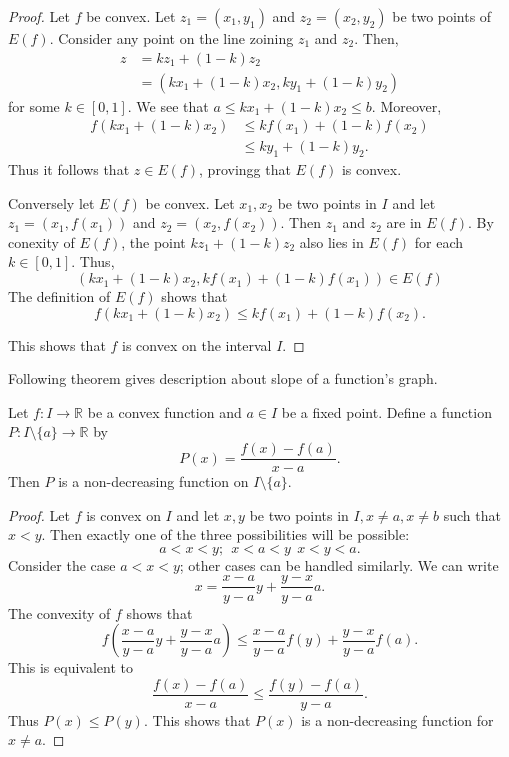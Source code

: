 \begin{proof}
  Let $f$ be convex. Let $z_1 = (x_1, y_1)$ and $z_2 = (x_2, y_2)$ be two points of $E(f)$. Consider any point on the line zoining
  $z_1$ and $z_2$. Then,
  $$\begin{aligned}z & = kz_1 + (1 - k)z_2\\& = (kx_1 + (1 - k)x_2, ky_1 + (1 - k)y_2)\end{aligned}$$ for some $k\in[0, 1]$. We see
  that $a\leq kx_1 + (1 - k)x_2\leq b$. Moreover,
  $$\begin{aligned}f(kx_1 + (1 - k)x_2)&\leq kf(x_1) + (1 - k)f(x_2)\\&\leq ky_1 + (1 - k)y_2.\end{aligned}$$
  Thus it follows that $z\in E(f)$, provingg that $E(f)$ is convex.

  Conversely let $E(f)$ be convex. Let $x_1, x_2$ be two points in $I$ and let $z_1 = (x_1,f(x_1))$ and $z_2 = (x_2, f(x_2))$. Then
  $z_1$ and $z_2$ are in $E(f)$. By conexity of $E(f)$, the point $kz_1 + (1 - k)z_2$ also lies in $E(f)$ for each $k\in[0,
    1]$. Thus,
  $$(kx_1 + (1 - k)x_2, kf(x_1) + (1 - k)f(x_1))\in E(f)$$
  The definition of $E(f)$ shows that $$f(kx_1 + (1 - k)x_2)\leq kf(x_1) + (1 - k)f(x_2).$$

  This shows that $f$ is convex on the interval $I$.
\end{proof}

Following theorem gives description about slope of a function's graph.

\begin{theorem}
  Let $f:I\rightarrow\mathbb{R}$ be a convex function and $a\in I$ be a fixed point. Define a function $P:I\setminus\{a\}\rightarrow
  \mathbb{R}$ by $$P(x) = \frac{f(x) - f(a)}{x - a}.$$ Then $P$ is a non-decreasing function on $I\setminus\{a\}$.
\end{theorem}

\begin{proof}
  Let $f$ is convex on $I$ and let $x, y$ be two points in $I, x\neq a, x\neq b$ such that $x<y$. Then exactly one of the three
  possibilities will be possible:
  $$a<x<y;~~x<a<y~~x<y<a.$$
  Consider the case $a<x<y$; other cases can be handled similarly. We can write
  $$x = \frac{x - a}{y - a}y + \frac{y - x}{y - a}a.$$
  The convexity of $f$ shows that
  $$f\left(\frac{x - a}{y - a}y + \frac{y - x}{y - a}a\right)\leq \frac{x - a}{y - a}f(y) + \frac{y - x}{y - a}f(a).$$
  This is equivalent to
  $$\frac{f(x) - f(a)}{x - a}\leq \frac{f(y) - f(a)}{y - a}.$$
  Thus $P(x)\leq P(y).$ This shows that $P(x)$ is a non-decreasing function for $x\neq a$.
\end{proof}

